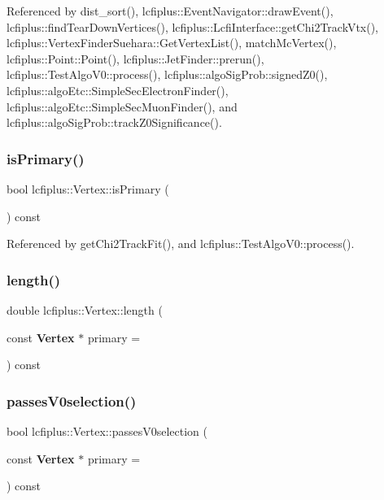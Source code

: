 Referenced by dist\+\_\+sort(), lcfiplus\+::\+Event\+Navigator\+::draw\+Event(), lcfiplus\+::find\+Tear\+Down\+Vertices(), lcfiplus\+::\+Lcfi\+Interface\+::get\+Chi2\+Track\+Vtx(), lcfiplus\+::\+Vertex\+Finder\+Suehara\+::\+Get\+Vertex\+List(), match\+Mc\+Vertex(), lcfiplus\+::\+Point\+::\+Point(), lcfiplus\+::\+Jet\+Finder\+::prerun(), lcfiplus\+::\+Test\+Algo\+V0\+::process(), lcfiplus\+::algo\+Sig\+Prob\+::signed\+Z0(), lcfiplus\+::algo\+Etc\+::\+Simple\+Sec\+Electron\+Finder(), lcfiplus\+::algo\+Etc\+::\+Simple\+Sec\+Muon\+Finder(), and lcfiplus\+::algo\+Sig\+Prob\+::track\+Z0\+Significance().

\mbox{\label{classlcfiplus_1_1Vertex_ab110117656e0fe6d5c6703f2126052a2}} 
\subsubsection{is\+Primary()}
{\footnotesize\ttfamily bool lcfiplus\+::\+Vertex\+::is\+Primary (\begin{DoxyParamCaption}{ }\end{DoxyParamCaption}) const\hspace{0.3cm}{\ttfamily [inline]}}



Referenced by get\+Chi2\+Track\+Fit(), and lcfiplus\+::\+Test\+Algo\+V0\+::process().

\mbox{\label{classlcfiplus_1_1Vertex_aff6005ccd775406262542af837349f96}} 
\subsubsection{length()}
{\footnotesize\ttfamily double lcfiplus\+::\+Vertex\+::length (\begin{DoxyParamCaption}\item[{const \textbf{ Vertex} $\ast$}]{primary = {} }\end{DoxyParamCaption}) const}

\mbox{\label{classlcfiplus_1_1Vertex_a4ae4cf97b8c33598a210b7e6c99e9812}} 
\subsubsection{passes\+V0selection()}
{\footnotesize\ttfamily bool lcfiplus\+::\+Vertex\+::passes\+V0selection (\begin{DoxyParamCaption}\item[{const \textbf{ Vertex} $\ast$}]{primary = {} }\end{DoxyParamCaption}) const}



